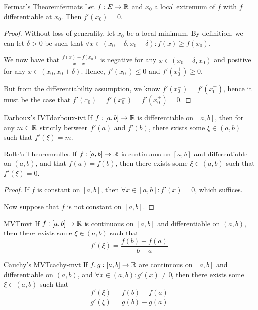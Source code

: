 \documentclass{styles/tufte}
\begin{document}
\begin{theorem}{Fermat's Theorem}{fermats}
  Let $f: E \to \mathbb{R}$ and $x_0$ a local extremum of $f$ with $f$ differentiable at $x_0$. Then $f'(x_0) = 0$.
\end{theorem}

\begin{proof}
  Without loss of generality, let $x_0$ be a local minimum. By definition, we can let $\delta > 0$ be such that $\forall x \in (x_0 - \delta, x_0 + \delta) : f(x) \geqslant f(x_0)$.
  
  We now have that $\frac{f(x) - f(x_0)}{x - x_0}$ is negative for any $x \in (x_0 - \delta, x_0)$ and positive for any $x \in (x_0, x_0+ \delta)$. Hence, $f'(x_0^-) \leqslant 0$ and $f'(x_0^+) \geqslant 0$.
  
  But from the differentiability assumption, we know $f'(x_0^-) = f'(x_0^+)$, hence it must be the case that $f'(x_0) = f'(x_0^-) = f'(x_0^+) = 0$.
\end{proof}

\begin{lemma}{Darboux's IVT}{darboux-ivt}
  If $f: [a, b] \to \mathbb{R}$ is differentiable on $[a, b]$, then for any $m \in \mathbb{R}$ strictly between $f'(a)$ and $f'(b)$, there exists some $\xi \in (a, b)$ such that $f'(\xi) = m$.
\end{lemma}

\begin{theorem}{Rolle's Theorem}{rolles}
  If $f: [a, b] \to \mathbb{R}$ is continuous on $[a, b]$ and differentiable on $(a, b)$, and that $f(a) = f(b)$, then there exists some $\xi \in (a, b)$ such that $f'(\xi) = 0$.
\end{theorem}

\begin{proof}
  If $f$ is constant on $[a, b]$, then $\forall x \in [a, b]: f'(x) = 0$, which suffices.
  
  Now suppose that $f$ is not constant on $[a, b]$.
\end{proof}


\begin{theorem}{MVT}{mvt}
  If $f: [a, b] \to \mathbb{R}$ is continuous on $[a, b]$ and differentiable on $(a, b)$, then there exists some $\xi \in (a, b)$ such that
  \[ f'(\xi) = \frac{f(b) - f(a)}{b - a} \]
\end{theorem}

\begin{theorem}{Cauchy's MVT}{cachy-mvt}
  If $f, g: [a, b] \to \mathbb{R}$ are continuous on $[a, b]$ and differentiable on $(a, b)$, and $\forall x \in (a, b) : g'(x) \neq 0$, then there exists some $\xi \in (a, b)$ such that
  \[ \frac{f'(\xi)}{g'(\xi)} = \frac{f(b) - f(a)}{g(b) - g(a)} \]
\end{theorem}




  
\end{document}
